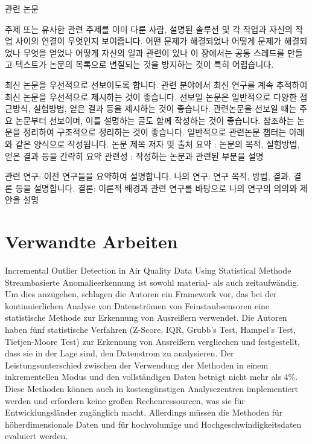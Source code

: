 관련 논문

주제 또는 유사한 관련 주제를 이미 다룬 사람, 설명된 솔루션 및 각 작업과 자신의 작업 사이의 연결이 무엇인지 보여줍니다.
어떤 문제가 해결되었나 어떻게 문제가 해결되었나 무엇을 얻었나 어떻게 자신의 일과 관련이 있나
이 장에서는 공통 스레드를 만들고 텍스트가 논문의 목록으로 변질되는 것을 방지하는 것이 특히 어렵습니다.

최신 논문을 우선적으로 선보이도록 합니다. 관련 분야에서 최신 연구를 계속 추적하여 최신 논문을 우선적으로 제시하는 것이 좋습니다.
선보일 논문은 일반적으로 다양한 접근방식, 실험방법, 얻은 결과 등을 제시하는 것이 좋습니다.
관련논문을 선보일 때는 주요 논문부터 선보이며, 이를 설명하는 글도 함께 작성하는 것이 좋습니다.
참조하는 논문을 정리하여 구조적으로 정리하는 것이 좋습니다.
일반적으로 관련논문 챕터는 아래와 같은 양식으로 작성됩니다.
논문 제목
저자 및 출처
요약 : 논문의 목적, 실험방법, 얻은 결과 등을 간략히 요약
관련성 : 작성하는 논문과 관련된 부분을 설명

관련 연구: 이전 연구들을 요약하여 설명합니다.
나의 연구: 연구 목적, 방법, 결과, 결론 등을 설명합니다.
결론: 이론적 배경과 관련 연구를 바탕으로 나의 연구의 의의와 제안을 설명



\chapterpage\chapter{Verwandte Arbeiten}
    Incremental Outlier Detection in Air Quality Data Using Statistical Methode
        Streambasierte Anomalieerkennung ist sowohl material- als auch zeitaufwändig. Um dies anzugehen, schlagen die Autoren ein Framework vor, das bei der kontinuierlichen Analyse von Datenströmen von Feinstaubsensoren eine statistische Methode zur Erkennung von Ausreißern verwendet. Die Autoren haben fünf statistische Verfahren (Z-Score, IQR, Grubb's Test, Hampel's Test, Tietjen-Moore Test) zur Erkennung von Ausreißern vergliechen und festgestellt, dass sie in der Lage sind, den Datenstrom zu analysieren. Der Leistungsunterschied zwischen der Verwendung der Methoden in einem inkrementellen Modus und den vollständigen Daten beträgt nicht mehr als 4\%. Diese Methoden können auch in kostengünstigen Analysezentren implementiert werden und erfordern keine großen Rechenressourcen, was sie für Entwicklungsländer zugänglich macht. Allerdings müssen die Methoden für höherdimensionale Daten und für hochvolumige und Hochgeschwindigkeitsdaten evaluiert werden.

